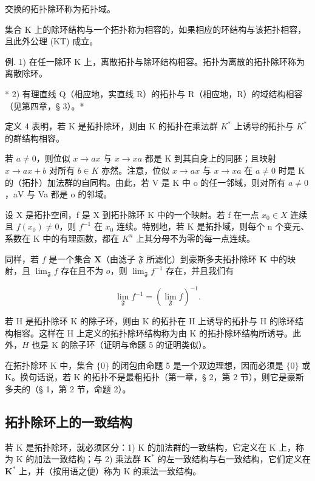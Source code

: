 交换的拓扑除环称为拓扑域。

集合 K 上的除环结构与一个拓扑称为相容的，如果相应的环结构与该拓扑相容，且此外公理 (KT) 成立。

例. 1) 在任一除环 K 上，离散拓扑与除环结构相容。拓扑为离散的拓扑除环称为离散除环。

* 2) 有理直线 Q（相应地，实直线 R）的拓扑与 R（相应地，R）的域结构相容（见第四章，§ 3）。*

定义 4 表明，若 K 是拓扑除环，则由 K 的拓扑在乘法群 \(K^{*}\) 上诱导的拓扑与 \(K^{*}\) 的群结构相容。

若 \(a \neq 0\)，则位似 \(x \rightarrow ax\) 与 \(x \rightarrow xa\) 都是 K 到其自身上的同胚；且映射 \(x \rightarrow ax + b\) 对所有 \(b \in K\) 亦然。注意，位似 \(x \rightarrow ax\) 与 \(x \rightarrow xa\) 在 \(a \neq 0\) 时是 K 的（拓扑）加法群的自同构。由此，若 V 是 K 中 o 的任一邻域，则对所有 \(a \neq 0\)，aV 与 Va 都是 o 的邻域。

设 X 是拓扑空间，f 是 X 到拓扑除环 K 中的一个映射。若 f 在一点 \(x_{0} \in X\) 连续且 \(f(x_{0}) \neq 0\)，则 \(f^{-1}\) 在 \(x_{0}\) 连续。特别地，若 K 是拓扑域，则每个 n 个变元、系数在 K 中的有理函数，都在 \(K^{n}\) 上其分母不为零的每一点连续。

同样，若 \(f\) 是一个集合 \(\mathbf{X}\)（由滤子 \(\mathfrak{F}\) 所滤化）到豪斯多夫拓扑除环 \(\mathbf{K}\) 中的映射，且 \(\lim_{\mathfrak{F}} f\) 存在且不为 \(o\)，则 \(\lim_{\mathfrak{F}} f^{-1}\) 存在，并且我们有

\[
\lim _ {\mathfrak {F}} f ^ {- 1} = (\lim _ {\mathfrak {F}} f) ^ {- 1}.\tag{4}
\]

若 H 是拓扑除环 K 的除子环，则由 K 的拓扑在 H 上诱导的拓扑与 H 的除环结构相容。这样在 H 上定义的拓扑除环结构称为由 K 的拓扑除环结构所诱导。此外，\(\overline{H}\) 也是 K 的除子环（证明与命题 5 的证明类似）。

在拓扑除环 K 中，集合 \(\{0\}\) 的闭包由命题 5 是一个双边理想，因而必须是 \(\{0\}\) 或 K。换句话说，若 K 的拓扑不是最粗拓扑（第一章，§ 2，第 2 节），则它是豪斯多夫的（§ 1，第 2 节，命题 2）。

\subsection{拓扑除环上的一致结构}

若 K 是拓扑除环，就必须区分：1) K 的加法群的一致结构，它定义在 K 上，称为 K 的加法一致结构；与 2) 乘法群 \(\mathbf{K}^*\) 的左一致结构与右一致结构，它们定义在 \(\mathbf{K}^*\) 上，并（按用语之便）称为 K 的乘法一致结构。

